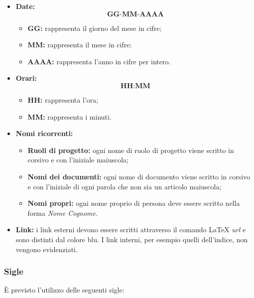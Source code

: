 \documentclass[../NormediProgetto.tex]{subfiles}
\begin{document}
\begin{itemize}
	
	\item{\textbf{Date:}}  \[\textbf{GG-MM-AAAA}\]
	\begin{itemize}
		\item{\textbf{GG:}} rappresenta il giorno del mese in cifre;
		\item{\textbf{MM:}} rappresenta il mese in cifre;
		\item{\textbf{AAAA:}} rappresenta l'anno in cifre per intero.
		
	\end{itemize}
	
	\item{\textbf{Orari:}} \[\textbf{HH:MM}\]
	\begin{itemize}
		\item{\textbf{HH:}} rappresenta l'ora;
		\item{\textbf{MM:}} rappresenta i minuti.
	\end{itemize}
	
	\item{\textbf{Nomi ricorrenti:}}
	\begin{itemize}
		\item{\textbf{Ruoli di progetto:}} ogni nome di ruolo di progetto viene scritto in corsivo e con l’iniziale maiuscola;
		\item{\textbf{Nomi dei documenti:}} ogni nome di documento viene scritto in corsivo e con l’iniziale di ogni parola che non sia un articolo maiuscola;
		\item{\textbf{Nomi propri:}} ogni nome proprio di persona deve essere scritto nella forma \textit{Nome Cognome}.
	\end{itemize}
	
	\item{\textbf{Link:}} i link esterni devono essere scritti attraverso il comando \LaTeX{} \textit{url} e sono distinti dal colore blu. I link interni, per esempio quelli dell'indice, non vengono evidenziati.
\end{itemize}

\subsubsection{Sigle}

È previsto l’utilizzo delle seguenti sigle: 
\end{document}
